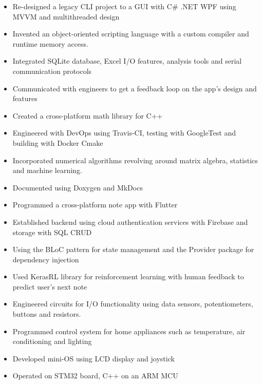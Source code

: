 \documentclass[11pt,a4paper,ragged2e]{altacv}
\begin{document}
\begin{paracol}{1}
{}

\begin{itemize}
\item Re-designed a legacy CLI project to a GUI with C\# .NET WPF using MVVM and multithreaded design
\item Invented an object-oriented scripting language with a custom compiler and runtime memory access.
\item Integrated SQLite database, Excel I/O features, analysis tools and serial communication protocols 
\item Communicated with engineers to get a feedback loop on the app's design and features
\end{itemize}

\tightdivider
{}
\begin{itemize}
\item Created a cross-platform math library for C++ 
\item Engineered with DevOps using Travis-CI, testing with GoogleTest and building with Docker Cmake
\item Incorporated numerical algorithms revolving around matrix algebra, statistics and machine learning.
\item Documented using Doxygen and MkDocs
\end{itemize}
\tightdivider


\begin{itemize}
\item Programmed a cross-platform note app with Flutter
\item Established backend using cloud authentication services with Firebase and storage with SQL CRUD 
\item Using the BLoC pattern for state management and the Provider package for dependency injection
\item Used KerasRL library for reinforcement learning with human feedback to predict user's next note
\end{itemize}
\tightdivider

\begin{itemize}
\item Engineered circuits for I/O functionality using data sensors, potentiometers, buttons and resistors.
\item Programmed control system for home appliances such as temperature, air conditioning and lighting 
\item Developed mini-OS using LCD display and joystick 
\item Operated on STM32 board, C++ on an ARM MCU
\end{itemize}


\end{paracol}
\end{document}
